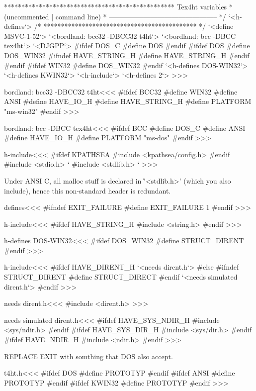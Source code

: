 {*************************************************
    Tex4ht variables                            *
    (uncommented | command line)                *
----------------------------------------------- */
`<h-defines`>
/* ******************************************** */
`<define MSVC-1-52`>
`<bordland: bcc32 -DBCC32 t4ht`>
`<bordland: bcc -DBCC tex4ht`>
`<DJGPP`>
#ifdef DOS_C
#define DOS
#endif
#ifdef DOS
#define DOS_WIN32
#ifndef HAVE_STRING_H
#define HAVE_STRING_H
#endif
#endif
#ifdef WIN32
#define DOS_WIN32
#endif
`<h-defines DOS-WIN32`>
`<h-defines KWIN32`>
`<h-include`>
`<h-defines 2`>
>>>


\<bordland: bcc32 -DBCC32 t4ht\><<<
#ifdef BCC32
#define WIN32 
#define ANSI       
#define HAVE_IO_H
#define HAVE_STRING_H
#define PLATFORM "ms-win32"
#endif
>>>

% 

\<bordland: bcc -DBCC tex4ht\><<<
#ifdef BCC
#define DOS_C
#define ANSI       
#define HAVE_IO_H
#define PLATFORM "ms-dos"
#endif
>>>


\<h-include\><<<
#ifdef KPATHSEA
#include <kpathsea/config.h>
#endif
#include <stdio.h>   `%
#include <stdlib.h>  `%
>>>



  Under ANSI C, all malloc stuff is declared in \`'<stdlib.h>' (which you
also include), hence this non-standard header is redundant.



\<defines\><<<
#ifndef EXIT_FAILURE
#define EXIT_FAILURE 1
#endif
>>>

\<h-include\><<<
#ifdef HAVE_STRING_H
#include <string.h>
#endif
>>>




\<h-defines DOS-WIN32\><<<
#ifdef DOS_WIN32
#define STRUCT_DIRENT
#endif
>>>


\<h-include\><<<
#ifdef HAVE_DIRENT_H
`<needs dirent.h`>
#else
#ifndef STRUCT_DIRENT
#define STRUCT_DIRECT
#endif
`<needs simulated dirent.h`>
#endif 
>>>



\<needs dirent.h\><<<
#include <dirent.h>
>>>


\<needs simulated dirent.h\><<<
#ifdef HAVE_SYS_NDIR_H
#include <sys/ndir.h>
#endif
#ifdef HAVE_SYS_DIR_H
#include <sys/dir.h>
#endif
#ifdef HAVE_NDIR_H
#include <ndir.h>
#endif
>>>


REPLACE EXIT with somthing that DOS also accept.




\<t4ht.h\><<<
#ifdef DOS
#define PROTOTYP
#endif
#ifdef ANSI
#define PROTOTYP
#endif
#ifdef KWIN32
#define PROTOTYP
#endif
>>>

}
